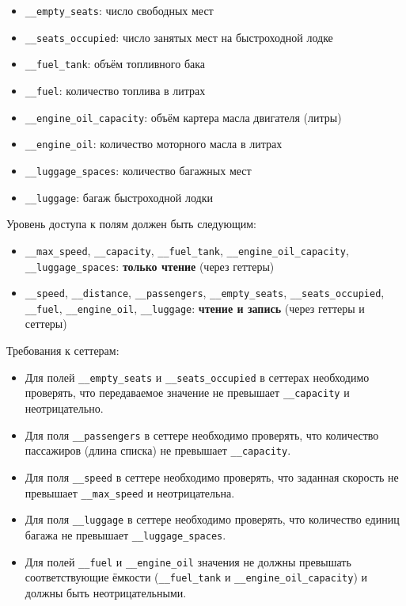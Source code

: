 \begin{enumerate}
\begin{itemize}
    \item \texttt{\_\_empty\_seats}: число свободных мест  
    \item \texttt{\_\_seats\_occupied}: число занятых мест на быстроходной лодке  
    \item \texttt{\_\_fuel\_tank}: объём топливного бака  
    \item \texttt{\_\_fuel}: количество топлива в литрах  
    \item \texttt{\_\_engine\_oil\_capacity}: объём картера масла двигателя (литры)  
    \item \texttt{\_\_engine\_oil}: количество моторного масла в литрах  
    \item \texttt{\_\_luggage\_spaces}: количество багажных мест  
    \item \texttt{\_\_luggage}: багаж быстроходной лодки  
\end{itemize}
Уровень доступа к полям должен быть следующим:
\begin{itemize}
    \item \texttt{\_\_max\_speed}, \texttt{\_\_capacity}, \texttt{\_\_fuel\_tank}, \texttt{\_\_engine\_oil\_capacity}, \texttt{\_\_luggage\_spaces}: \textbf{только чтение} (через геттеры)  
    \item \texttt{\_\_speed}, \texttt{\_\_distance}, \texttt{\_\_passengers}, \texttt{\_\_empty\_seats}, \texttt{\_\_seats\_occupied}, \texttt{\_\_fuel}, \texttt{\_\_engine\_oil}, \texttt{\_\_luggage}: \textbf{чтение и запись} (через геттеры и сеттеры)
\end{itemize}
Требования к сеттерам:
\begin{itemize}
    \item Для полей \texttt{\_\_empty\_seats} и \texttt{\_\_seats\_occupied} в сеттерах необходимо проверять, что передаваемое значение не превышает \texttt{\_\_capacity} и неотрицательно.  
    \item Для поля \texttt{\_\_passengers} в сеттере необходимо проверять, что количество пассажиров (длина списка) не превышает \texttt{\_\_capacity}.  
    \item Для поля \texttt{\_\_speed} в сеттере необходимо проверять, что заданная скорость не превышает \texttt{\_\_max\_speed} и неотрицательна.  
    \item Для поля \texttt{\_\_luggage} в сеттере необходимо проверять, что количество единиц багажа не превышает \texttt{\_\_luggage\_spaces}.
    \item Для полей \texttt{\_\_fuel} и \texttt{\_\_engine\_oil} значения не должны превышать соответствующие ёмкости (\texttt{\_\_fuel\_tank} и \texttt{\_\_engine\_oil\_capacity}) и должны быть неотрицательными.

\end{itemize}
\end{enumerate}
